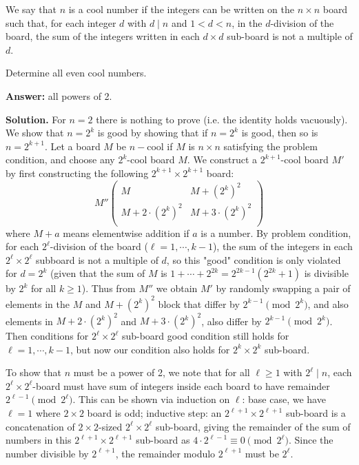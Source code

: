 \documentclass[11pt,a4paper]{article}
\begin{document}
\begin{enumerate}
    	We say that $n$ is a cool number if the integers can be written on the $n\times n$ board such that, for each integer $d$ with $d\mid n$ and $1<d<n$, in the $d$-division of the board, the sum of the integers written in each $d\times d$ sub-board is not a multiple of $d$.
    	
    	Determine all even cool numbers.
    	
    	
    	\textbf{Answer: }all powers of 2. 
    	
    	\textbf{Solution.} 
    	For $n = 2$ there is nothing to prove (i.e. the identity holds vacuously). 
    	We show that $n = 2^k$ is good by showing that if $n = 2^k$ is good, 
    	then so is $n = 2^{k + 1}$. 
    	Let a board $M$ be $n-$cool if $M$ is $n\times n$ satisfying the problem condition, 
    	and choose any $2^k$-cool board $M$. 
    	We construct a $2^{k+1}$-cool board $M'$ by first constructing the following $2^{k+1}\times 2^{k+1}$ board: 
    	\[
    	M''\begin{pmatrix}
    		M & M + (2^k)^2\\
    		M + 2\cdot (2^k)^2 & M + 3\cdot (2^k)^2\\
    	\end{pmatrix}
    	\]
    	where $M + a$ means elementwise addition if $a$ is a number. 
    	By problem condition, for each $2^{\ell}$-division of the board ($\ell=1, \cdots, k - 1$), 
    	the sum of the integers in each $2^{\ell}\times 2^{\ell}$ subboard is not a multiple of $d$, 
    	so this "good" condition is only violated for $d = 2^k$ 
    	(given that the sum of $M$ is $1 + \cdots + 2^{2k} = 2^{2k-1}(2^{2k}+1)$ is divisible by $2^k$ for all $k\ge 1$). 
    	Thus from $M''$ we obtain $M'$ by randomly swapping a pair of elements in the $M$ and $M+(2^k)^2$ block that differ by $2^{k-1}\pmod{2^k}$, 
    	and also elements in $M + 2\cdot (2^k)^2$ and $M + 3\cdot (2^k)^2$, also differ by $2^{k-1}\pmod{2^k}$. 
    	Then conditions for $2^{\ell}\times 2^{\ell}$ sub-board good condition still holds for $\ell=1, \cdots, k - 1$, 
    	but now our condition also holds for $2^k\times 2^k$ sub-board. 
    	
    	To show that $n$ must be a power of 2, 
    	we note that for all $\ell\ge 1$ with $2^{\ell}\mid n$, each $2^{\ell}\times 2^{\ell}$-board must have sum of integers inside each board to have remainder $2^{\ell-1}\pmod{2^{\ell}}$. 
    	This can be shown via induction on $\ell$: 
    	base case, we have 
    	$\ell = 1$ where $2\times 2$ board is odd; 
    	inductive step: an $2^{\ell+1}\times 2^{\ell+1}$ sub-board is a concatenation of $2\times 2$-sized $2^{\ell}\times 2^{\ell}$ sub-board, 
    	giving the remainder of the sum of numbers in this $2^{\ell+1}\times 2^{\ell+1}$ sub-board as $4\cdot 2^{\ell-1}\equiv 0\pmod{2^{\ell}}$. 
    	Since the number divisible by $2^{\ell+1}$, the remainder modulo $2^{\ell+1}$ must be $2^{\ell}$. 
    	

\end{enumerate}
\end{document}

